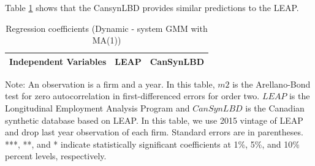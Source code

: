 Table \ref{Dynamic - system GMM with MA(1)} shows that the CansynLBD provides similar predictions to the LEAP.

\begin{table}[H]
  \centering
\begin{threeparttable}
 \caption{Regression coefficients (Dynamic - system GMM with MA(1))} \label{Dynamic - system GMM with MA(1)} \medskip
\renewcommand{\arraystretch}{1}
\begin{tabular}{l|c c| c c}
\toprule
\textbf{Independent Variables}&\multicolumn{2}{c|}{\textbf{LEAP}} &  \multicolumn{2}{c}{\textbf{CanSynLBD}}\\
\midrule

   \bottomrule
  \end{tabular} 
\begin{tablenotes}
\small
\item Note: An observation is a firm and a year. In this table, $m2$ is the Arellano-Bond test for zero autocorrelation in first-differenced errors for order two. $LEAP$ is the Longitudinal Employment Analysis Program and $CanSynLBD$ is the Canadian synthetic database based on LEAP. In this table, we use 2015 vintage of LEAP and drop last year observation of each firm. Standard errors are in parentheses. ***, **, and * indicate statistically significant coefficients at 1\%, 5\%, and 10\% percent levels, respectively.
 \end{tablenotes}
 \end{threeparttable}
\end{table}
